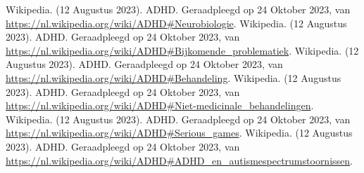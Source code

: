 \begin{thebibliography}{9}
                Wikipedia. (12 Augustus 2023). ADHD. Geraadpleegd op 24 Oktober 2023, van \url{https://nl.wikipedia.org/wiki/ADHD#Neurobiologie}.
                Wikipedia. (12 Augustus 2023). ADHD. Geraadpleegd op 24 Oktober 2023, van \url{https://nl.wikipedia.org/wiki/ADHD#Bijkomende_problematiek}.
                Wikipedia. (12 Augustus 2023). ADHD. Geraadpleegd op 24 Oktober 2023, van \url{https://nl.wikipedia.org/wiki/ADHD#Behandeling}.
                Wikipedia. (12 Augustus 2023). ADHD. Geraadpleegd op 24 Oktober 2023, van \url{https://nl.wikipedia.org/wiki/ADHD#Niet-medicinale_behandelingen}.
                Wikipedia. (12 Augustus 2023). ADHD. Geraadpleegd op 24 Oktober 2023, van \url{https://nl.wikipedia.org/wiki/ADHD#Serious_games}.
                Wikipedia. (12 Augustus 2023). ADHD. Geraadpleegd op 24 Oktober 2023, van \url{https://nl.wikipedia.org/wiki/ADHD#ADHD_en_autismespectrumstoornissen}.
        \newpage     
        

\end{thebibliography}
